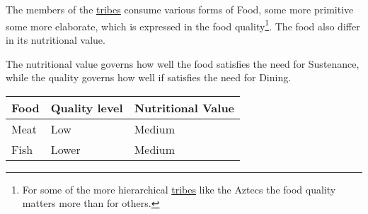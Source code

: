 \section{}\label{ch:Goods:Food}

The members of the \hyperref[ch:Tribes]{tribes} consume various forms of
\gls*{Food}, some more primitive some more elaborate, which is expressed in the
food quality\footnote{ For some of the more hierarchical
	\hyperref[ch:Tribes]{tribes} like the \gls{Aztecs} the food quality matters
	more than for others. }. The food also differ in its nutritional value.

The nutritional value governs how well the food satisfies the need for
\gls{Sustenance}, while the quality governs how well if satisfies the need for
\gls{Dining}.


\begin{longtable}{lll}
	\toprule
	\Gls*{Food} & Quality level & Nutritional Value \\
	\midrule
	\Gls{Meat}  & Low           & Medium            \\
	\Gls{Fish}  & Lower         & Medium            \\
	\bottomrule
\end{longtable}
